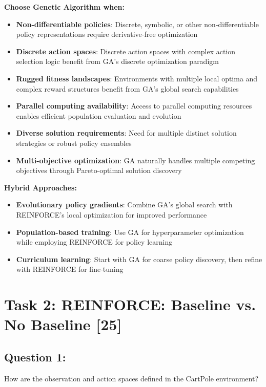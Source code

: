 \documentclass[12pt]{article}
\begin{document}
{{{\textbf{Choose Genetic Algorithm when:}
\begin{itemize}
    \item \textbf{Non-differentiable policies}: Discrete, symbolic, or other non-differentiable policy representations require derivative-free optimization
    \item \textbf{Discrete action spaces}: Discrete action spaces with complex action selection logic benefit from GA's discrete optimization paradigm
    \item \textbf{Rugged fitness landscapes}: Environments with multiple local optima and complex reward structures benefit from GA's global search capabilities
    \item \textbf{Parallel computing availability}: Access to parallel computing resources enables efficient population evaluation and evolution
    \item \textbf{Diverse solution requirements}: Need for multiple distinct solution strategies or robust policy ensembles
    \item \textbf{Multi-objective optimization}: GA naturally handles multiple competing objectives through Pareto-optimal solution discovery
\end{itemize}

\textbf{Hybrid Approaches:}
\begin{itemize}
    \item \textbf{Evolutionary policy gradients}: Combine GA's global search with REINFORCE's local optimization for improved performance
    \item \textbf{Population-based training}: Use GA for hyperparameter optimization while employing REINFORCE for policy learning
    \item \textbf{Curriculum learning}: Start with GA for coarse policy discovery, then refine with REINFORCE for fine-tuning
\end{itemize} 

\newpage

\section{Task 2: REINFORCE: Baseline vs. No Baseline [25]}

\subsection{Question 1:}

How are the observation and action spaces defined in the CartPole environment?
\vspace*{0.3cm}

}}}
\end{document}
